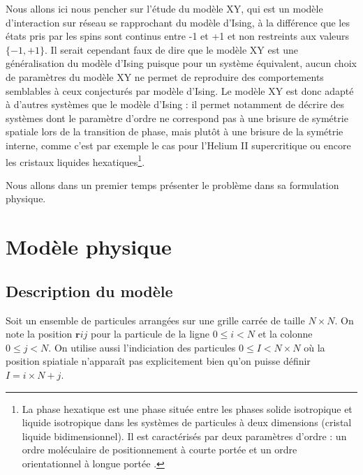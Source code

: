 \documentclass[a4paper, 11pt]{article}
\newcommand{\vr}{\bm{r}}
\begin{document}
Nous allons ici nous pencher sur l'étude du modèle XY, qui est un modèle d'interaction sur réseau se
rapprochant du modèle d'Ising, à la différence que les états pris par les spins sont continus entre
-1 et +1 et non restreints aux valeurs $\{-1, +1\}$. Il serait cependant faux de dire que le modèle
XY est une généralisation du modèle d'Ising puisque pour un système équivalent, aucun choix de
paramètres du modèle XY ne permet de reproduire des comportements semblables à ceux conjecturés par
modèle d'Ising. Le modèle XY est donc adapté à d'autres systèmes que le modèle d'Ising : il permet
notamment de décrire des systèmes dont le paramètre d'ordre ne correspond pas à une brisure de
symétrie spatiale lors de la transition de phase, mais plutôt à une brisure de la symétrie interne,
comme c'est par exemple le cas pour  l'Helium II supercritique ou encore les cristaux liquides
hexatiques\footnote{La phase hexatique est une phase située entre les phases solide isotropique et
liquide isotropique dans les systèmes de particules à deux dimensions (cristal liquide
bidimensionnel). Il est caractérisés par deux paramètres d'ordre : un ordre moléculaire de
positionnement à courte portée et un ordre orientationnel à longue portée
\cite{wiki:phase_hexatique}.}.

Nous allons dans un premier temps présenter le problème dans sa formulation physique.
 
\section{Modèle physique}

\subsection{Description du modèle}

Soit un ensemble de particules arrangées sur une grille carrée de taille $N\times N$. On note la
position $\vr{ij}$ pour la particule de la ligne $0 \le i < N$ et la colonne $0 \le j < N$. On
utilise aussi l'indiciation des particules $0 \le I < N\times N$ où la position spiatiale n'apparaît
pas explicitement bien qu'on puisse définir $I = i\times N +j$.
\end{document}
